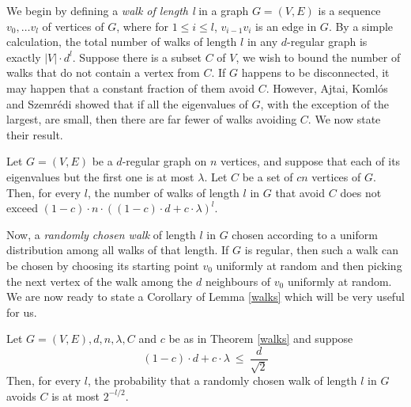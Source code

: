 We begin by defining a {\em walk of length l} in a graph $G = (V,E)$
is a sequence $v_0, \ldots v_l$ of vertices of $G$, where for $1 \le i
\le l$, $v_{i-1}v_i$ is an edge in $G$. By a simple calculation, the
total number of walks of length $l$ in any $d$-regular graph is
exactly $|V|\cdot d^l$. Suppose there is a subset $C$ of $V$, we wish
to bound the number of walks that do not contain a vertex from $C$. If
$G$ happens to be disconnected, it may happen that a constant fraction
of them avoid $C$. However, Ajtai, Koml\'{o}s and Szemr\'{e}di
\cite{AKS87} showed that if all the eigenvalues of $G$, with the
exception of the largest, are small, then there are far fewer of walks
avoiding $C$. We now state their result.

\begin{theorem} \label{walks} Let $G = (V,E)$ be a $d$-regular graph
  on $n$ vertices, and suppose that each of its eigenvalues but the
  first one is at most $\lambda$. Let $C$ be a set of $cn$ vertices of
  $G$. Then, for every $l$, the number of walks of length $l$ in $G$
  that avoid $C$ does not exceed $(1 - c)\cdot n \cdot ((1 - c) \cdot
  d + c \cdot \lambda)^l$.
\end{theorem}

Now, a {\em randomly chosen walk} of length $l$ in $G$ chosen
according to a uniform distribution among all walks of that length.
If $G$ is regular, then such a walk can be chosen by choosing its
starting point $v_0$ uniformly at random and then picking the next
vertex of the walk among the $d$ neighbours of $v_0$ uniformly at
random. We are now ready to state a Corollary of Lemma \ref{walks}
which will be very useful for us.

\begin{corollary}\label{randomwalks}
  Let $G = (V,E), d, n, \lambda, C$ and $c$ be as in Theorem
  \ref{walks} and suppose 
\[
(1 - c)\cdot d + c \cdot \lambda \ \le \ \frac{d}{\sqrt{2}}
\]
Then, for every $l$, the probability that a randomly chosen walk of
length $l$ in $G$ avoids $C$ is at most $2^{{-l}/{2}}$.
\end{corollary}

